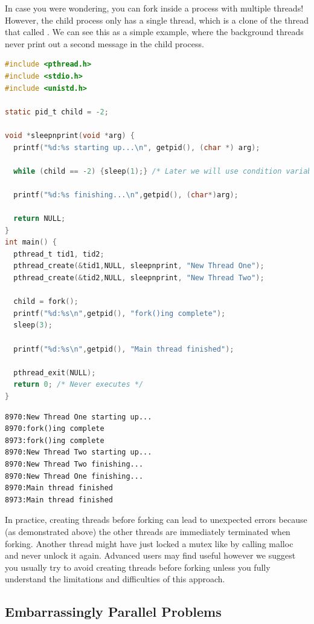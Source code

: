 In case you were wondering, you can fork inside a process with multiple threads!
However, the child process only has a single thread, which is a clone of the thread that called .
We can see this as a simple example, where the background threads never print out a second message in the child process.

\begin{lstlisting}[language=C]
#include <pthread.h>
#include <stdio.h>
#include <unistd.h>

static pid_t child = -2;

void *sleepnprint(void *arg) {
  printf("%d:%s starting up...\n", getpid(), (char *) arg);

  while (child == -2) {sleep(1);} /* Later we will use condition variables */

  printf("%d:%s finishing...\n",getpid(), (char*)arg);

  return NULL;
}
int main() {
  pthread_t tid1, tid2;
  pthread_create(&tid1,NULL, sleepnprint, "New Thread One");
  pthread_create(&tid2,NULL, sleepnprint, "New Thread Two");

  child = fork();
  printf("%d:%s\n",getpid(), "fork()ing complete");
  sleep(3);

  printf("%d:%s\n",getpid(), "Main thread finished");

  pthread_exit(NULL);
  return 0; /* Never executes */
}
\end{lstlisting}

\begin{verbatim}
8970:New Thread One starting up...
8970:fork()ing complete
8973:fork()ing complete
8970:New Thread Two starting up...
8970:New Thread Two finishing...
8970:New Thread One finishing...
8970:Main thread finished
8973:Main thread finished
\end{verbatim}

In practice, creating threads before forking can lead to unexpected errors because (as demonstrated above) the other threads are immediately terminated when forking.
Another thread might have just locked a mutex like by calling malloc and never unlock it again.
Advanced users may find  useful however we suggest you usually try to avoid creating threads before forking unless you fully understand the limitations and difficulties of this approach.

\subsection{Embarrassingly Parallel Problems}

